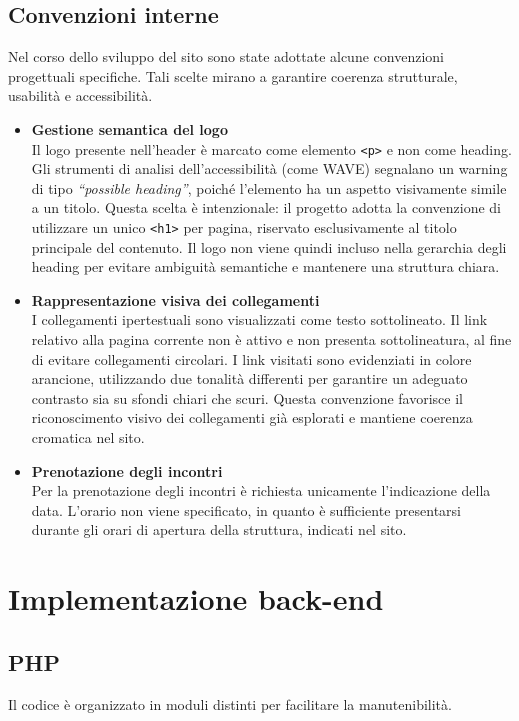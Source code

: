 \documentclass[10pt, letterpaper]{article}
\begin{document}
\subsection{Convenzioni interne}
Nel corso dello sviluppo del sito sono state adottate alcune convenzioni progettuali specifiche.
Tali scelte mirano a garantire coerenza strutturale, usabilità e accessibilità.

\begin{itemize}
    \item \textbf{Gestione semantica del logo} \\
    Il logo presente nell’header è marcato come elemento \texttt{<p>} e non come heading. 
    Gli strumenti di analisi dell’accessibilità (come WAVE) segnalano un warning di tipo \emph{“possible heading''}, poiché l’elemento ha un aspetto visivamente simile a un titolo. 
    Questa scelta è intenzionale: il progetto adotta la convenzione di utilizzare un unico \texttt{<h1>} per pagina, riservato esclusivamente al titolo principale del contenuto. 
    Il logo non viene quindi incluso nella gerarchia degli heading per evitare ambiguità semantiche e mantenere una struttura chiara.
    \item \textbf{Rappresentazione visiva dei collegamenti} \\
    I collegamenti ipertestuali sono visualizzati come testo sottolineato.  
    Il link relativo alla pagina corrente non è attivo e non presenta sottolineatura, al fine di evitare collegamenti circolari.  
    I link visitati sono evidenziati in colore arancione, utilizzando due tonalità differenti per garantire un adeguato contrasto sia su sfondi chiari che scuri.  
    Questa convenzione favorisce il riconoscimento visivo dei collegamenti già esplorati e mantiene coerenza cromatica nel sito.
    \item \textbf{Prenotazione degli incontri} \\
    Per la prenotazione degli incontri è richiesta unicamente l’indicazione della data.  
    L’orario non viene specificato, in quanto è sufficiente presentarsi durante gli orari di apertura della struttura, indicati nel sito.
\end{itemize}

\section{Implementazione back-end}
\subsection{PHP}
Il codice è organizzato in moduli distinti per facilitare la manutenibilità.
\end{document}
